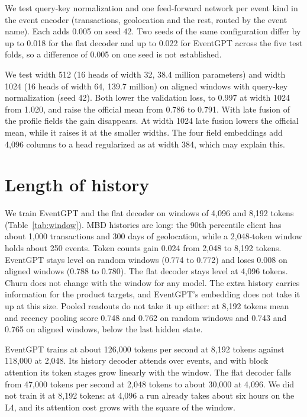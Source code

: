 \documentclass[12pt]{article}
\begin{document}
We test query-key normalization and one feed-forward network per event kind in the event encoder (transactions, geolocation and the rest, routed by the event name). Each adds 0.005 on seed 42. Two seeds of the same configuration differ by up to 0.018 for the flat decoder and up to 0.022 for EventGPT across the five test folds, so a difference of 0.005 on one seed is not established.

We test width 512 (16 heads of width 32, 38.4 million parameters) and width 1024 (16 heads of width 64, 139.7 million) on aligned windows with query-key normalization (seed 42). Both lower the validation loss, to 0.997 at width 1024 from 1.020, and raise the official mean from 0.786 to 0.791. With late fusion of the profile fields the gain disappears. At width 1024 late fusion lowers the official mean, while it raises it at the smaller widths. The four field embeddings add 4,096 columns to a head regularized as at width 384, which may explain this.

\section{Length of history}\label{sec:context}

We train EventGPT and the flat decoder on windows of 4,096 and 8,192 tokens (Table~\ref{tab:window}). MBD histories are long: the 90th percentile client has about 1,000 transactions and 300 days of geolocation, while a 2,048-token window holds about 250 events. Token counts gain 0.024 from 2,048 to 8,192 tokens. EventGPT stays level on random windows (0.774 to 0.772) and loses 0.008 on aligned windows (0.788 to 0.780). The flat decoder stays level at 4,096 tokens. Churn does not change with the window for any model. The extra history carries information for the product targets, and EventGPT's embedding does not take it up at this size. Pooled readouts do not take it up either: at 8,192 tokens mean and recency pooling score 0.748 and 0.762 on random windows and 0.743 and 0.765 on aligned windows, below the last hidden state.

EventGPT trains at about 126,000 tokens per second at 8,192 tokens against 118,000 at 2,048. Its history decoder attends over events, and with block attention its token stages grow linearly with the window. The flat decoder falls from 47,000 tokens per second at 2,048 tokens to about 30,000 at 4,096. We did not train it at 8,192 tokens: at 4,096 a run already takes about six hours on the L4, and its attention cost grows with the square of the window.
\end{document}
